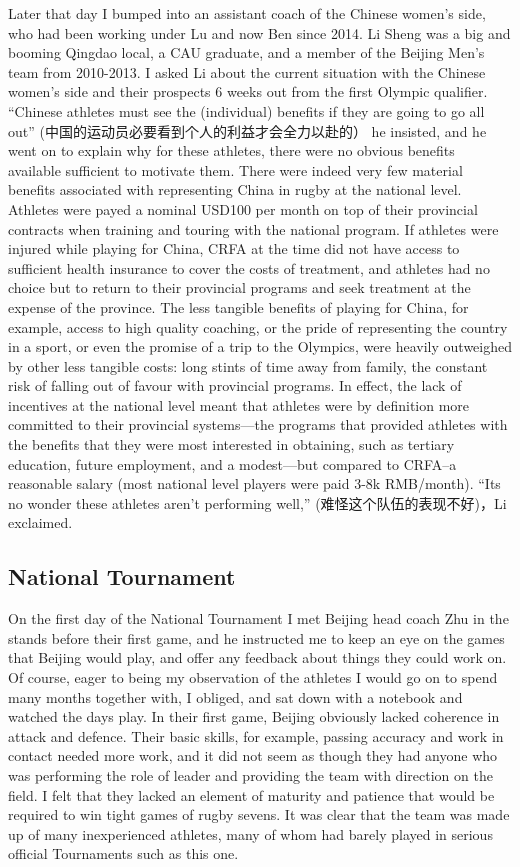 \begin{CJK}{UTF8}{gbsn}
  Later that day I bumped into an assistant coach of the Chinese women's side, who had been working under Lu and now Ben since 2014.  Li Sheng was a big and booming Qingdao local, a CAU graduate, and a member of the Beijing Men's team from 2010-2013.  I asked Li about the current situation with the Chinese women's side and their prospects 6 weeks out from the first Olympic qualifier.  ``Chinese athletes must see the (individual) benefits if they are going to go all out'' (中国的运动员必要看到个人的利益才会全力以赴的） he insisted, and he went on to explain why for these athletes, there were no obvious benefits available sufficient to motivate them.  There were indeed very few material benefits associated with representing China in rugby at the national level.  Athletes were payed a nominal USD100 per month on top of their provincial contracts when training and touring with the national program.  If athletes were injured while playing for China, CRFA at the time did not have access to sufficient health insurance to cover the costs of treatment, and athletes had no choice but to return to their provincial programs and seek treatment at the expense of the province.  The less tangible benefits of playing for China, for example, access to high quality coaching, or the pride of representing the country in a sport, or even the promise of a trip to the Olympics, were heavily outweighed by other less tangible costs: long stints of time away from family, the constant risk of falling out of favour with provincial programs.  In effect, the lack of incentives at the national level meant that athletes were by definition more committed to their provincial systems---the programs that provided athletes with the benefits that they were most interested in obtaining, such as tertiary education, future employment, and a modest---but compared to CRFA--a reasonable salary (most national level players were paid 3-8k RMB/month). ``Its no wonder these athletes aren't performing well,'' (难怪这个队伍的表现不好)，Li exclaimed.

  \subsection{National Tournament}
  On the first day of the National Tournament I met Beijing head coach Zhu in the stands before their first game, and he instructed me to keep an eye on the games that Beijing would play, and offer any feedback about things they could work on.  Of course, eager to being my observation of the athletes I would go on to spend many months together with, I obliged, and sat down with a notebook and watched the days play.  In their first game, Beijing obviously lacked coherence in attack and defence.  Their basic skills, for example, passing accuracy and work in contact needed more work, and it did not seem as though they had anyone who was performing the role of leader and providing the team with direction on the field.  I felt that they lacked an element of maturity and patience that would be required to win tight games of rugby sevens. It was clear that the team was made up of many inexperienced athletes, many of whom had barely played in serious official Tournaments such as this one.


\end{CJK}
